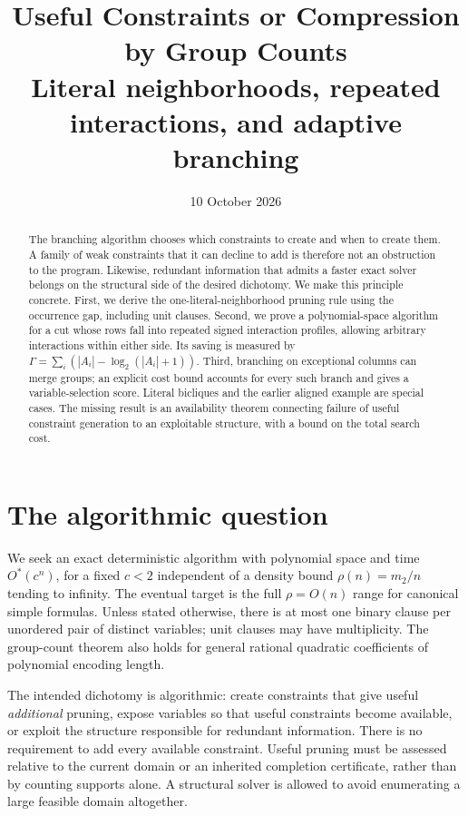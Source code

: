 \documentclass[11pt,a4paper]{article}
\title{Useful Constraints or Compression by Group Counts\\
\large Literal neighborhoods, repeated interactions, and adaptive branching}
\author{}
\date{10 October 2026}
\theoremstyle{definition}
\newcommand{\Ostar}{O^{*}}
\begin{document}
\maketitle

\begin{abstract}
The branching algorithm chooses which constraints to create and when to
create them. A family of weak constraints that it can decline to add is
therefore not an obstruction to the program. Likewise, redundant information
that admits a faster exact solver belongs on the structural side of the
desired dichotomy. We make this principle concrete. First, we derive the
one-literal-neighborhood pruning rule using the occurrence gap, including
unit clauses. Second, we prove a polynomial-space algorithm for a cut whose
rows fall into repeated signed interaction profiles, allowing arbitrary
interactions within either side. Its saving is measured by
$\Gamma=\sum_i(|A_i|-\log_2(|A_i|+1))$. Third, branching on exceptional
columns can merge groups; an explicit cost bound accounts for every such
branch and gives a variable-selection score. Literal bicliques and the
earlier aligned example are special cases. The missing result is an
availability theorem connecting failure of useful constraint generation to
an exploitable structure, with a bound on the total search cost.
\end{abstract}

\section{The algorithmic question}

We seek an exact deterministic algorithm with polynomial space and time
$\Ostar(c^n)$, for a fixed $c<2$ independent of a density bound
$\rho(n)=m_2/n$ tending to infinity. The eventual target is the full
$\rho=O(n)$ range for canonical simple formulas. Unless stated otherwise,
there is at most one binary clause per unordered pair of distinct variables;
unit clauses may have multiplicity. The group-count theorem also holds for
general rational quadratic coefficients of polynomial encoding length.

The intended dichotomy is algorithmic: create constraints that give useful
\emph{additional} pruning, expose variables so that useful constraints become
available, or exploit the structure responsible for redundant information.
There is no requirement to add every available constraint. Useful pruning
must be assessed relative to the current domain or an inherited completion
certificate, rather than by counting supports alone. A structural solver is
allowed to avoid enumerating a large feasible domain altogether.
\end{document}
